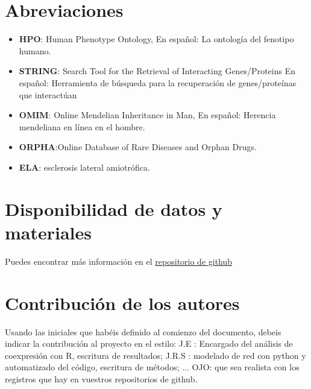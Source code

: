 \documentclass{bmcart}
\begin{document}
	\begin{backmatter}
	
		\section*{Abreviaciones}%
		\begin{itemize}
			\item \textbf{HPO}: Human Phenotype Ontology, En español: La ontología del fenotipo humano.
			\item \textbf{STRING}: Search Tool for the Retrieval of Interacting Genes/Proteins En español: Herramienta de búsqueda para la recuperación de genes/proteínas que interactúan
			\item \textbf{OMIM}: Online Mendelian Inheritance in Man, En español: Herencia mendeliana en línea en el hombre.
			\item \textbf{ORPHA}:Online Database of Rare Diseases and Orphan Drugs.
			\item \textbf{ELA}: esclerosis lateral amiotrófica.
		\end{itemize}
		
		\section*{Disponibilidad de datos y materiales}%
			
			
			Puedes encontrar más información en el \href{https://github.com/Diegodepab/project_template}{repositorio de github}
			 
			
		\section*{Contribución de los autores}
			Usando las iniciales que habéis definido al comienzo del documento, debeis indicar la contribución al proyecto en el estilo:
			J.E : Encargado del análisis de coexpresión con R, escritura de resultados; J.R.S : modelado de red con python y automatizado del código, escritura de métodos; ...
			OJO: que sea realista con los registros que hay en vuestros repositorios de github. 
		
		
		
		
	\end{backmatter}
\end{document}
